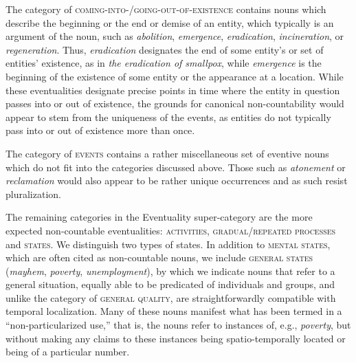 \documentclass[output=paper]{langscibook}
\begin{document}
\begin{sloppypar}
The category of \textsc{coming-into-/going-out-of-existence} contains nouns which describe the beginning or the end or demise of an entity, which typically is an argument of the noun, such as \textit{abolition}, \textit{emergence}, \textit{eradication}, \textit{incineration}, or \textit{regeneration}.  Thus, \textit{eradication} designates the end of some entity's or set of entities' existence, as in \textit{the eradication of smallpox}, while \textit{emergence} is the beginning of the existence of some entity or the appearance at a location.  While these eventualities designate precise points in time where the entity in question passes into or out of existence, the grounds for canonical non-countability would appear to stem from the uniqueness of the events, as entities do not typically pass into or out of existence more than once.%
\end{sloppypar}


The category of \textsc{events} contains a rather miscellaneous set of eventive nouns which do not fit into the categories discussed above.  Those such as  \textit{atonement} or \textit{reclamation} would also appear to be rather unique occurrences and as such resist pluralization. 


The remaining categories in the Eventuality super-category are the more expected non-countable eventualities: \textsc{activities}, \textsc{gradual/repeated processes} and \textsc{states}. We distinguish two types of states.  In addition to \textsc{mental states}, which are often cited as non-countable nouns, we include \textsc{general states} (\textit{mayhem}, \textit{poverty}, \textit{unemployment}), by which we indicate nouns that refer to a general situation, equally able to be predicated of individuals and groups, and unlike the category of \textsc{general quality}, are straightforwardly compatible with temporal localization.   Many of these nouns manifest what has been termed in \citet{grimm2016crime} a ``non-particularized use,'' that is, the nouns refer to instances of, e.g., \textit{poverty}, but without making any claims to these instances being spatio-temporally located or being of a particular number.






\end{document}
